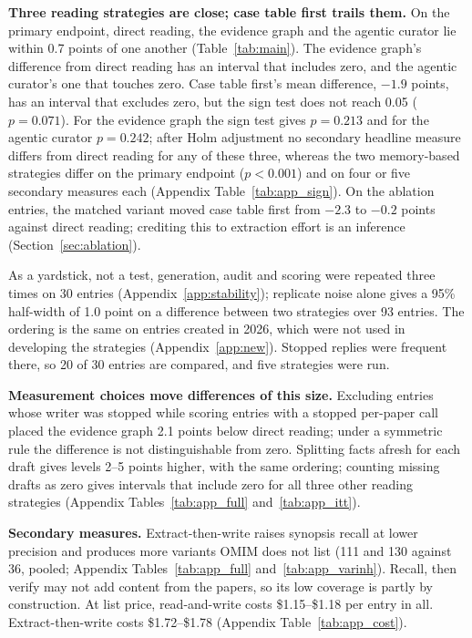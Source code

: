 \documentclass{article} %
\begin{document}
\textbf{Three reading strategies are close; case table first trails them.} On the primary endpoint, direct reading, the evidence graph and the agentic curator lie within 0.7 points of one another (Table~\ref{tab:main}). The evidence graph's difference from direct reading has an interval that includes zero, and the agentic curator's one that touches zero. Case table first's mean difference, $-1.9$ points, has an interval that excludes zero, but the sign test does not reach 0.05 ($p=0.071$). For the evidence graph the sign test gives $p=0.213$ and for the agentic curator $p=0.242$; after Holm adjustment no secondary headline measure differs from direct reading for any of these three, whereas the two memory-based strategies differ on the primary endpoint ($p<0.001$) and on four or five secondary measures each (Appendix Table~\ref{tab:app_sign}). On the ablation entries, the matched variant moved case table first from $-2.3$ to $-0.2$ points against direct reading; crediting this to extraction effort is an inference (Section~\ref{sec:ablation}).

As a yardstick, not a test, generation, audit and scoring were repeated three times on 30 entries (Appendix~\ref{app:stability}); replicate noise alone gives a 95\% half-width of 1.0 point on a difference between two strategies over 93 entries. The ordering is the same on entries created in 2026, which were not used in developing the strategies (Appendix~\ref{app:new}). Stopped replies were frequent there, so 20 of 30 entries are compared, and five strategies were run.

\textbf{Measurement choices move differences of this size.} Excluding entries whose writer was stopped while scoring entries with a stopped per-paper call placed the evidence graph 2.1 points below direct reading; under a symmetric rule the difference is not distinguishable from zero. Splitting facts afresh for each draft gives levels 2--5 points higher, with the same ordering; counting missing drafts as zero gives intervals that include zero for all three other reading strategies (Appendix Tables~\ref{tab:app_full} and~\ref{tab:app_itt}).

\textbf{Secondary measures.} Extract-then-write raises synopsis recall at lower precision and produces more variants OMIM does not list (111 and 130 against 36, pooled; Appendix Tables~\ref{tab:app_full} and~\ref{tab:app_varinh}). Recall, then verify may not add content from the papers, so its low coverage is partly by construction. At list price, read-and-write costs \$1.15--\$1.18 per entry in all. Extract-then-write costs \$1.72--\$1.78 (Appendix Table~\ref{tab:app_cost}).
\end{document}
